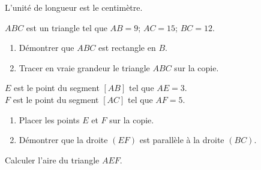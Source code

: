 L'unité de longueur est le centimètre.\par $ABC$ est un triangle tel que $AB=9$; $AC=15$; $BC=12$.
  \begin{myenumerate}
    \item
      \begin{enumerate}
      \item Démontrer que $ABC$ est rectangle en $B$.
      \item Tracer en vraie grandeur le triangle $ABC$ sur la copie.
      \end{enumerate}
    \item $E$ est le point du segment $[AB]$ tel que $AE=3$.\\$F$ est le point du segment $[AC]$ tel que $AF=5$.
      \begin{enumerate}
      \item Placer les points $E$ et $F$ sur la copie.
      \item Démontrer que la droite $(EF)$ est parallèle à la droite $(BC)$.
      \end{enumerate}
    \item Calculer l'aire du triangle $AEF$.
  \end{myenumerate}
